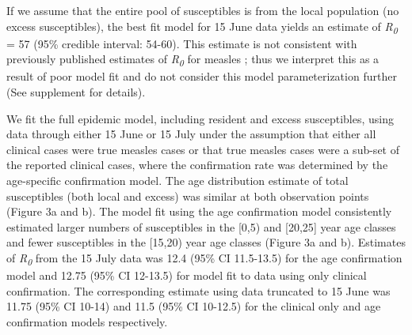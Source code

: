 If we assume that the entire pool of susceptibles is from the local population (no excess susceptibles), the best fit model for 15 June data yields an estimate of \emph{R\textsubscript{0}} = 57 (95\% credible interval: 54-60). This estimate is not consistent with previously published estimates of \emph{R\textsubscript{0}} for measles \cite{EDMUNDS_2000,MOSSONG_2000}; thus we interpret this as a result of poor model fit and do not consider this model parameterization further (See supplement for details).

We fit the full epidemic model, including resident and excess susceptibles, using data through either 15 June or 15 July under the assumption that either all clinical cases were true measles cases or that true measles cases were a sub-set of the reported clinical cases, where the confirmation rate was determined by the age-specific confirmation model. The age distribution estimate of total susceptibles (both local and excess) was similar at both observation points (Figure 3a and b). The model fit using the age confirmation model consistently estimated larger numbers of susceptibles in the {[}0,5) and {[}20,25{]} year age classes and fewer susceptibles in the {[}15,20) year age classes (Figure 3a and b). Estimates of \emph{R\textsubscript{0}} from the 15 July data was 12.4 (95\% CI 11.5-13.5) for the age confirmation model and 12.75 (95\% CI 12-13.5) for model fit to
data using only clinical confirmation. The corresponding estimate using data truncated to 15 June was 11.75 (95\% CI 10-14) and 11.5 (95\% CI 10-12.5) for the clinical only and age confirmation models respectively.